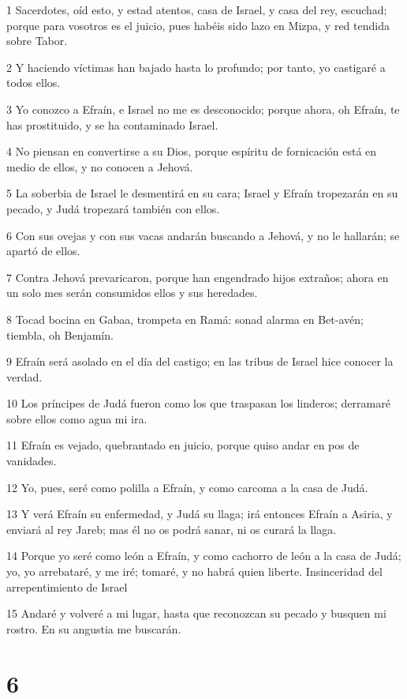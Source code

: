 \par 1 Sacerdotes, oíd esto, y estad atentos, casa de Israel, y casa del rey, escuchad; porque para vosotros es el juicio, pues habéis sido lazo en Mizpa, y red tendida sobre Tabor.
\par 2 Y haciendo víctimas han bajado hasta lo profundo; por tanto, yo castigaré a todos ellos.
\par 3 Yo conozco a Efraín, e Israel no me es desconocido; porque ahora, oh Efraín, te has prostituido, y se ha contaminado Israel.
\par 4 No piensan en convertirse a su Dios, porque espíritu de fornicación está en medio de ellos, y no conocen a Jehová.
\par 5 La soberbia de Israel le desmentirá en su cara; Israel y Efraín tropezarán en su pecado, y Judá tropezará también con ellos.
\par 6 Con sus ovejas y con sus vacas andarán buscando a Jehová, y no le hallarán; se apartó de ellos.
\par 7 Contra Jehová prevaricaron, porque han engendrado hijos extraños; ahora en un solo mes serán consumidos ellos y sus heredades.
\par 8 Tocad bocina en Gabaa, trompeta en Ramá: sonad alarma en Bet-avén; tiembla, oh Benjamín.
\par 9 Efraín será asolado en el día del castigo; en las tribus de Israel hice conocer la verdad.
\par 10 Los príncipes de Judá fueron como los que traspasan los linderos; derramaré sobre ellos como agua mi ira.
\par 11 Efraín es vejado, quebrantado en juicio, porque quiso andar en pos de vanidades.
\par 12 Yo, pues, seré como polilla a Efraín, y como carcoma a la casa de Judá.
\par 13 Y verá Efraín su enfermedad, y Judá su llaga; irá entonces Efraín a Asiria, y enviará al rey Jareb; mas él no os podrá sanar, ni os curará la llaga.
\par 14 Porque yo seré como león a Efraín, y como cachorro de león a la casa de Judá; yo, yo arrebataré, y me iré; tomaré, y no habrá quien liberte.
Insinceridad del arrepentimiento de Israel
\par 15 Andaré y volveré a mi lugar, hasta que reconozcan su pecado y busquen mi rostro. En su angustia me buscarán.

\chapter{6}

